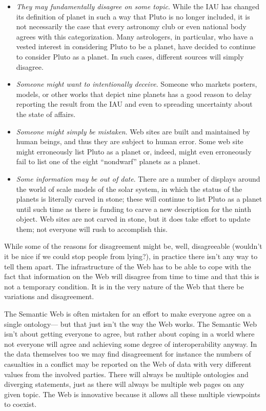\begin{itemize}
\item
  \emph{They may fundamentally disagree on some topic}. While the IAU
  has changed its definition of planet in such a way that Pluto is no
  longer included, it is not necessarily the case that every astronomy
  club or even national body agrees with this categorization. Many
  astrologers, in particular, who have a vested interest in considering
  Pluto to be a planet, have decided to continue to consider Pluto as a
  planet. In such cases, different sources will simply disagree.
\item
  \emph{Someone might want to intentionally deceive}. Someone who
  markets posters, models, or other works that depict nine planets has a
  good reason to delay reporting the result from the IAU and even to
  spreading uncertainty about the state of affairs.
\item
  \emph{Someone might simply be mistaken}. Web sites are built and
  maintained by human beings, and thus they are subject to human error.
  Some web site might erroneously list Pluto as a planet or, indeed,
  might even erroneously fail to list one of the eight ``nondwarf''
  planets as a planet.
\item
  \emph{Some information may be out of date}. There are a number of
  displays around the world of scale models of the solar system, in
  which the status of the planets is literally carved in stone; these
  will continue to list Pluto as a planet until such time as there is
  funding to carve a new description for the ninth object. Web sites are
  not carved in stone, but it does take effort to update them; not
  everyone will rush to accomplish this.
\end{itemize}


While some of the reasons for disagreement might be, well, disagreeable
(wouldn't it be nice if we could stop people from lying?), in practice
there isn't any way to tell them apart. The infrastructure of the Web
has to be able to cope with the fact that information on the Web will
disagree from time to time and that this is not a temporary condition.
It is in the very nature of the Web that there be variations and
disagreement.

The Semantic Web is often mistaken for an effort to make everyone agree
on a single ontology--- but that just isn't the way the Web works. The
Semantic Web isn't about getting everyone to agree, but rather about
coping in a world where not everyone will agree and achieving some
degree of interoperability anyway. In the data themselves too we may
find disagreement for instance the numbers of casualties in a conflict
may be reported on the Web of data with very different values from the
involved parties. There will always be multiple ontologies and diverging
statements, just as there will always be multiple web pages on any given
topic. The Web is innovative because it allows all these multiple
viewpoints to coexist.

